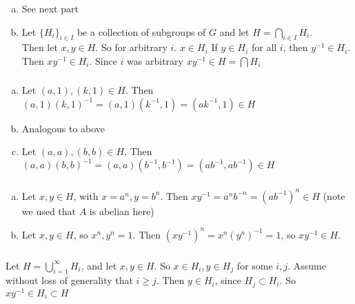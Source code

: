 \documentclass{article}
\newcommand{\set}[1]{ \{ #1 \} }
\newcommand{\inv}[1]{ {#1}^{-1} }
\begin{document}
\subsubsection{}\label{ex1p10}
\begin{enumerate}[(a)]
\item See next part
\item
Let $\set{H_i}_{i\in I}$ be a collection of subgroups of $G$
and let $H = \bigcap_{i\in I}H_i$.\\
Then let $x,y \in H$. So for arbitrary $i$. $x \in H_i$ If $y\in H_i$ for all $i$, then $\inv{y}\in H_i$. Then $x\inv{y} \in H_i$. Since $i$ was arbitrary $x\inv{y} \in H=\bigcap H_i$
\end{enumerate}
\subsubsection{}\label{ex1p11}
\begin{enumerate}[(a)]
\item Let $(a,1),(k,1)\in H$. Then $(a,1)\inv{(k,1)} = (a,1)(\inv{k},1) = (a\inv{k},1) \in H$
\item Analogous to above
\item Let $(a,a),(b,b) \in H$. Then $(a,a)\inv{(b,b)} = (a,a)(\inv{b},\inv{b}) = (a\inv{b},a\inv{b}) \in H$
\end{enumerate}
\subsubsection{}\label{ex1p12}

\begin{enumerate}[(a)]
\item Let $x,y\in H$, with $x=a^n, y=b^n$. Then $x\inv{y} = a^nb^{-n} = (a\inv{b})^n \in H$ (note we used that $A$ is abelian here)
\item Let $x,y\in H$, so $x^n,y^n=1$. Then $(x\inv{y})^n = x^n\inv{(y^n)} = 1$, so $x\inv{y} \in H$.
\end{enumerate}
\subsubsection{}\label{ex1p13}
\subsubsection{}\label{ex1p14}
\subsubsection{}\label{ex1p15}
Let $H = \bigcup_{i=1}^{\infty}H_i$, and let $x,y\in H$. So $x \in H_i, y\in H_j$ for some $i,j$. Assume without loss of generality that $i \geq j$. Then $y \in H_i$, since $H_j \subset H_i$. So $x\inv{y} \in H_i \subset H$
\end{document}
